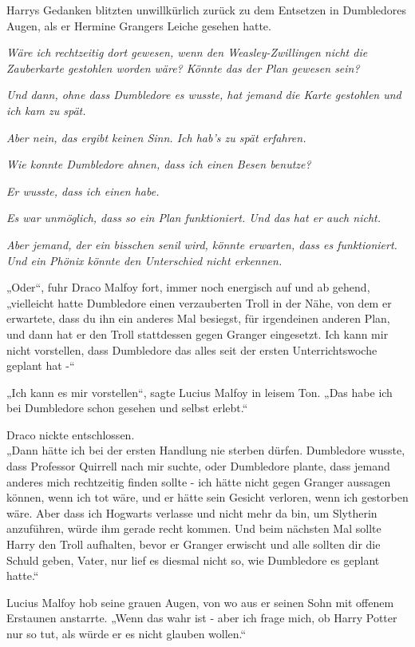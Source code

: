 {Harrys Gedanken blitzten unwillkürlich zurück zu dem Entsetzen in Dumbledores Augen, als er Hermine Grangers Leiche gesehen hatte.

\emph{Wäre ich rechtzeitig dort gewesen, wenn den Weasley-Zwillingen nicht die Zauberkarte gestohlen worden wäre? Könnte das der Plan gewesen sein?}

\emph{Und dann, ohne dass Dumbledore es wusste, hat jemand die Karte gestohlen und ich kam zu spät.}

\emph{Aber nein, das ergibt keinen Sinn. Ich hab's zu spät erfahren.}

\emph{Wie konnte Dumbledore ahnen, dass ich einen Besen benutze?}

\emph{Er wusste, dass ich einen habe.}

\emph{Es war unmöglich, dass so ein Plan funktioniert. Und das hat er auch nicht.}

\emph{Aber jemand, der ein bisschen senil wird, könnte erwarten, dass es funktioniert.}\\ \emph{Und ein Phönix könnte den Unterschied nicht erkennen.}

„Oder“, fuhr Draco Malfoy fort, immer noch energisch auf und ab gehend, „vielleicht hatte Dumbledore einen verzauberten Troll in der Nähe, von dem er erwartete, dass du ihn ein anderes Mal besiegst, für irgendeinen anderen Plan, und dann hat er den Troll stattdessen gegen Granger eingesetzt. Ich kann mir nicht vorstellen, dass Dumbledore das alles seit der ersten Unterrichtswoche geplant hat -“

„Ich kann es mir vorstellen“, sagte Lucius Malfoy in leisem Ton. „Das habe ich bei Dumbledore schon gesehen und selbst erlebt.“

Draco nickte entschlossen.\\ „Dann hätte ich bei der ersten Handlung nie sterben dürfen. Dumbledore wusste, dass Professor Quirrell nach mir suchte, oder Dumbledore plante, dass jemand anderes mich rechtzeitig finden sollte - ich hätte nicht gegen Granger aussagen können, wenn ich tot wäre, und er hätte sein Gesicht verloren, wenn ich gestorben wäre. Aber dass ich Hogwarts verlasse und nicht mehr da bin, um Slytherin anzuführen, würde ihm gerade recht kommen. Und beim nächsten Mal sollte Harry den Troll aufhalten, bevor er Granger erwischt und alle sollten dir die Schuld geben, Vater, nur lief es diesmal nicht so, wie Dumbledore es geplant hatte.“

Lucius Malfoy hob seine grauen Augen, von wo aus er seinen Sohn mit offenem Erstaunen anstarrte. „Wenn das wahr ist - aber ich frage mich, ob Harry Potter nur so tut, als würde er es nicht glauben wollen.“

}

